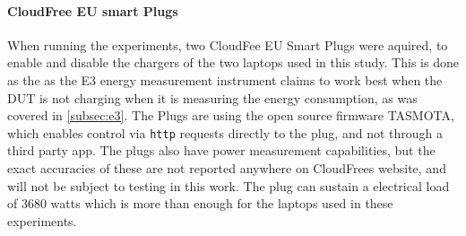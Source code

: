 \paragraph*{CloudFree EU smart Plugs}

When running the experiments, two CloudFee EU Smart Plugs were aquired, to enable and disable the chargers of the two laptops used in this study. This is done as the as the E3 energy measurement instrument claims to work best when the DUT is not charging when it is measuring the energy consumption, as was covered in \cref{subsec:e3}. The Plugs are using the open source firmware TASMOTA\cite{TomatoGit}, which enables control via \texttt{http} requests directly to the plug, and not through a third party app. The plugs also have power measurement capabilities, but the exact accuracies of these are not reported anywhere on CloudFrees website, and will not be subject to testing in this work. The plug can sustain a electrical load of 3680 watts which is more than enough for the laptops used in these experiments.